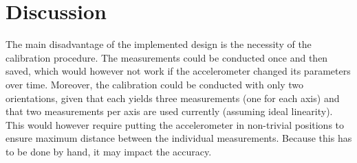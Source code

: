 \documentclass[a4paper, 12pt]{article}
\begin{document}
\section{Discussion}
The main disadvantage of the implemented design is the necessity of the calibration procedure. The measurements could be conducted once and then saved, which would however not work if the accelerometer changed its parameters over time. Moreover, the calibration could be conducted with only two orientations, given that each yields three measurements (one for each axis) and that two measurements per axis are used currently (assuming ideal linearity). This would however require putting the accelerometer in non-trivial positions to ensure maximum distance between the individual measurements. Because this has to be done by hand, it may impact the accuracy.

\clearpage
\sloppy
\printbibliography
\end{document}
